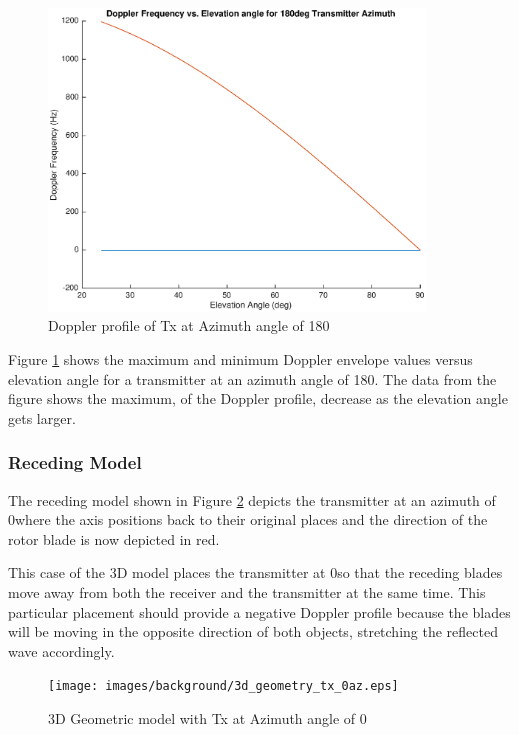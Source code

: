 \begin{figure}
	\begin{center}
		\includegraphics[width=10cm]{images/background/3d_geometry_tx_180az_doppler_profile.eps}
		\caption{Doppler profile of Tx at Azimuth angle of 180\textdegree}
		\label{fig:3D_model_180az_doppler}
	\end{center}
\end{figure}

Figure \ref{fig:3D_model_180az_doppler} shows the maximum and minimum Doppler envelope values versus elevation angle for a transmitter at an azimuth angle of 180\textdegree. The data from the figure shows the maximum, of the Doppler profile, decrease as the elevation angle gets larger.

\subsubsection{Receding Model}
The receding model shown in Figure \ref{fig:3D_model_0az} depicts the transmitter at an azimuth of 0\textdegree \space where the axis positions back to their original places and the direction of the rotor blade is now depicted in red.

This case of the 3D model places the transmitter at 0\textdegree \space so that the receding blades move away from both the receiver and the transmitter at the same time. This particular placement should provide a negative Doppler profile because the blades will be moving in the opposite direction of both objects, stretching the reflected wave accordingly.

\begin{figure}
	\begin{center}
		\texttt{[image: images/background/3d\_geometry\_tx\_0az.eps]}
		\caption{3D Geometric model with Tx at Azimuth angle of 0\textdegree}
		\label{fig:3D_model_0az}
	\end{center}
\end{figure}

